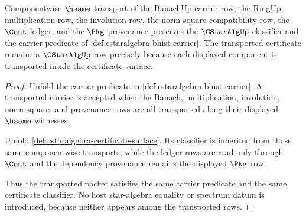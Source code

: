 \begin{theorem}
\label{thm:cstaralgebra-classifier-stability}
Componentwise $\hsame$ transport of the BanachUp carrier row, the RingUp
multiplication row, the involution row, the norm-square compatibility row, the
$\Cont$ ledger, and the $\Pkg$ provenance preserves the $\CStarAlgUp$
classifier and the carrier predicate of \autoref{def:cstaralgebra-bhist-carrier}.
The transported certificate remains a $\CStarAlgUp$ row precisely because each
displayed component is transported inside the certificate surface.
\end{theorem}
\begin{proof}
Unfold the carrier predicate in
\autoref{def:cstaralgebra-bhist-carrier}. A transported carrier is accepted when
the Banach, multiplication, involution, norm-square, and provenance rows are all
transported along their displayed $\hsame$ witnesses.

Unfold \autoref{def:cstaralgebra-certificate-surface}. Its classifier is
inherited from those same componentwise transports, while the ledger rows are
read only through $\Cont$ and the dependency provenance remains the displayed
$\Pkg$ row.

Thus the transported packet satisfies the same carrier predicate and the same
certificate classifier. No host star-algebra equality or spectrum datum is
introduced, because neither appears among the transported rows.
\end{proof}


